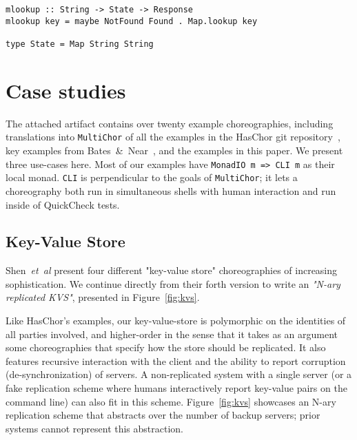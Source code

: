 \documentclass[sigplan,screen,review,anonymous]{acmart}
\newcommand{\HasChor}{Has\-Chor\xspace}
\newcommand{\inlinecode}[2][haskell]{\texttt{#2}}
\newcommand{\MultiChor}{\texttt{Multi\-Chor}\xspace}
\begin{document}
\begin{figure*}
\begin{mdframed}
\begin{verbatim}
mlookup :: String -> State -> Response
mlookup key = maybe NotFound Found . Map.lookup key

type State = Map String String
\end{verbatim}
\caption{A system for building key-value-store choreographies,
         including an example backup strategy that's polymorphic on the number of backup servers.}
\label{fig:kvs}
\end{mdframed}
\end{figure*}

\section{Case studies}\label{sec:examples}
The attached artifact contains over twenty example choreographies,
including translations into \MultiChor of all the examples in
the \HasChor git repository~\cite{haschor-repo},
key examples from Bates~\&~Near~\cite{bates2024know},
and the examples in this paper.
We present three use-cases here.
Most of our examples have \inlinecode{MonadIO m => CLI m} as their local monad.
\inlinecode{CLI} is perpendicular to the goals of \MultiChor;
it lets a choreography both run in simultaneous shells with human interaction and
run inside of QuickCheck tests.

\subsection{Key-Value Store}\label{sec:kvs}
Shen~\textit{et~al} present four different "key-value store" choreographies of increasing
sophistication.
We continue directly from their forth version to write an \emph{"N-ary replicated KVS"},
presented in Figure~\ref{fig:kvs}.

Like \HasChor's examples, our key-value-store is polymorphic on the identities of all parties
involved, and higher-order in the sense that it takes as an argument some choreographies
that specify how the store should be replicated.
It also features recursive interaction with the client and the ability to report corruption
(de-synchronization) of servers.
A non-replicated system with a single server
(or a fake replication scheme
where humans interactively report key-value pairs on the command line)
can also fit in this scheme.
Figure~\ref{fig:kvs} showcases an N-ary replication scheme
that abstracts over the number of backup servers;
prior systems cannot represent this abstraction.
\end{document}
